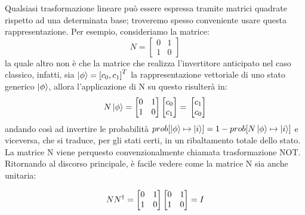 \documentclass[12pt,a4paper,openright]{report}
\begin{document}
Qualsiasi trasformazione lineare può essere espressa tramite matrici quadrate rispetto ad una determinata base; troveremo spesso conveniente usare 
questa rappresentazione. Per esempio, consideriamo la matrice:
\[
   N = \begin{bmatrix}
        0 & 1 \\
        1 & 0
    \end{bmatrix}
\]
la quale altro non è che la matrice che realizza l'invertitore anticipato nel caso classico, infatti, sia $\ket{\phi} = {[c_0, c_1]}^T$ 
la rappresentazione vettoriale di uno stato generico $\ket{\phi}$, allora l'applicazione di N su questo risulterà in: 
\[
    N\ket{\phi}=
    \begin{bmatrix}
        0 & 1 \\
        1 & 0
    \end{bmatrix}
    \begin{bmatrix}
        c_0 \\ c_1
    \end{bmatrix}=\\
    \begin{bmatrix}
        c_1 \\
        c_0
    \end{bmatrix}
\]
andando così ad invertire le probabilità $prob[\ket{\phi} \mapsto \ket{i}] = 1 - prob[N\ket{\phi} \mapsto \ket{i}]$ e viceversa,
che si traduce, per gli stati certi, in un ribaltamento totale dello stato. La matrice N viene perquesto convenzionalmente chiamata trasformazione NOT.\\
Ritornando al discorso principale, è facile vedere come la matrice N sia anche unitaria:

\[
    NN^{\dag} = 
    \begin{bmatrix}
        0 & 1 \\
        1 & 0
    \end{bmatrix}
    \begin{bmatrix}
        0 & 1 \\
        1 & 0
    \end{bmatrix}=\\
    I
\]
\par
\end{document}
